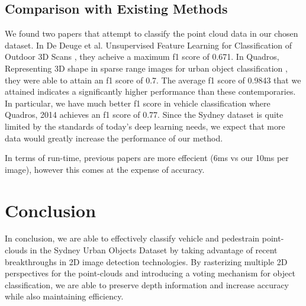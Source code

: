 \documentclass[runningheads,a4paper]{llncs}
\begin{document}
\subsection{Comparison with Existing Methods}
We found two papers that attempt to classify the point cloud data in our chosen dataset.
In De Deuge et al. Unsupervised Feature Learning for Classification of Outdoor 3D Scans
\cite{de2013unsupervised},
they acheive a maximum f1 score of 0.671. In Quadros, Representing 3D shape in sparse 
range images for urban object classification \cite{quadros2013representing}, they were 
able to attain an f1 score of 0.7. The average f1 score of 0.9843 that we attained 
indicates a significantly higher performance than these contemporaries. In particular,
we have much better f1 score in vehicle classification where Quadros, 2014 achieves an f1
score of 0.77. Since the Sydney dataset is quite limited by the standards of today's
deep learning needs, we expect that more data would greatly increase the performance of
our method.

In terms of run-time, previous papers are more effecient (6ms vs our 10ms per image), 
however this comes at the expense of accuracy.


\section{Conclusion}
In conclusion, we are able to effectively classify vehicle and pedestrain point-clouds in the 
Sydney Urban Objects Dataset by taking advantage of recent breakthroughs in 2D image
detection technologies. By rasterizing multiple 2D perspectives for the point-clouds and
introducing a voting mechanism for object classification, we are able to preserve depth 
information and increase accuracy while also maintaining efficiency.



\end{document}

